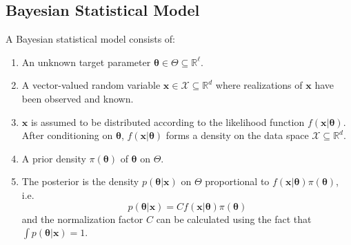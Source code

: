 \documentclass[13pt]{article}
\theoremstyle{definition}
\theoremstyle{remark}
\begin{document}
\subsection{Bayesian Statistical Model} \label{sec:Bayesian Statistical Model}
A Bayesian statistical model consists of:
\begin{enumerate}
\item An unknown target parameter $\bm{\theta}\in\Theta \subseteq \mathbb{R}^{\ell}$.  
    \item A vector-valued random variable $\bm{x} \in \mathcal{X} \subseteq \mathbb{R}^d$  where realizations of $\bm{x}$ have been observed and known.
    \item $\bm{x}$ is assumed to be distributed according to the likelihood function $f(\bm{x} | \bm{\theta})$. After conditioning on $\bm{\theta}$, $f(\bm{x} | \bm{\theta})$ forms a density on the data space $\mathcal{X} \subseteq \mathbb{R}^d$. 
    \item A prior density $\pi(\bm{\theta})$ of $\bm{\theta}$ on $\Theta$.
    \item The posterior  is the density $p(\bm{\theta}|\bm{x})$ on $\Theta$ proportional to $f(\bm{x} | \bm{\theta}) \pi(\bm{\theta})$, i.e.
    \[
    p(\bm{\theta}|\bm{x}) = C f(\bm{x} | \bm{\theta}) \pi(\bm{\theta})
    \]
    and the normalization factor $C$ can be calculated using the fact that $\int p(\bm{\theta}|\bm{x}) = 1$.
\end{enumerate}
\end{document}
